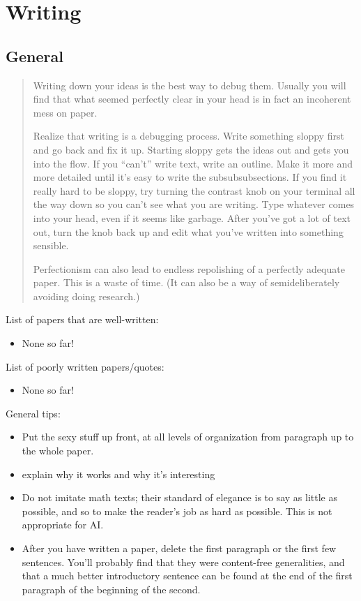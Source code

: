 \section{Writing}

\subsection{General}
\blockquote{Writing down your ideas is the best way to debug them. Usually you will
find that what seemed perfectly clear in your head is in fact an incoherent
mess on paper.

Realize that writing is
a debugging process. Write something sloppy first and go back and fix it up.
Starting sloppy gets the ideas out and gets you into the flow. If you “can’t”
write text, write an outline. Make it more and more detailed until it’s easy
to write the subsubsubsections. If you find it really hard to be sloppy, try
turning the contrast knob on your terminal all the way down so you can’t
see what you are writing. Type whatever comes into your head, even if it
seems like garbage. After you’ve got a lot of text out, turn the knob back
up and edit what you’ve written into something sensible.

Perfectionism can also lead to endless repolishing of a perfectly adequate
paper. This is a waste of time. (It can also be a way of semideliberately
avoiding doing research.) 
}

List of papers that are well-written:
\begin{itemize}
\item None so far!
\end{itemize}

List of poorly written papers/quotes:
\begin{itemize}
\item None so far!
\end{itemize}

General tips:
\begin{itemize}
\item Put the sexy stuff up front, at all levels of organization from paragraph
up to the whole paper.
\item explain why it works and why it’s interesting
\item Do not imitate math texts; their standard of elegance is to say as little
as possible, and so to make the reader’s job as hard as possible. This is not
appropriate for AI.
\item After you have written a paper, delete the first paragraph or the first few
sentences. You’ll probably find that they were content-free generalities, and
that a much better introductory sentence can be found at the end of the
first paragraph of the beginning of the second.
\end{itemize}

